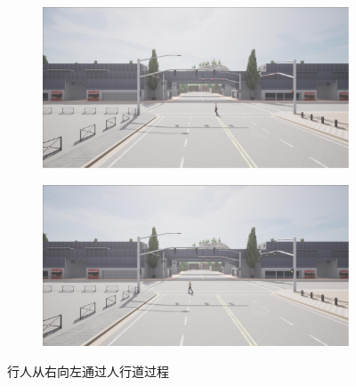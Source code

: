 \begin{figure}[H]
\begin{minipage}{\textwidth}
        \begin{subfigure}{0.48\textwidth}
            \includegraphics[width=\textwidth]{images/crossing_walking3.pdf}
        \end{subfigure}
        \begin{subfigure}{0.48\textwidth}
            \includegraphics[width=\textwidth]{images/crossing_walking4.pdf}
        \end{subfigure}

        \caption*{行人从右向左通过人行道过程}
    \end{minipage}

    \vspace{0.5cm}


\end{figure}
